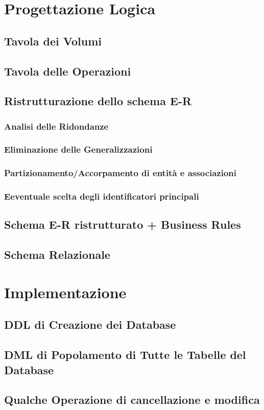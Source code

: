 \documentclass[letterpaper]{report}
\begin{document}
\chapter{Progettazione Logica}
\section{Tavola dei Volumi}



\section{Tavola delle Operazioni}



\section{Ristrutturazione dello schema E-R}
\subsection{Analisi delle Ridondanze}
\subsection{Eliminazione delle Generalizzazioni}
\subsection{Partizionamento/Accorpamento di entità e associazioni}
\subsection{Eeventuale scelta degli identificatori principali}
\section{Schema E-R ristrutturato + Business Rules}


\section{Schema Relazionale}

\chapter{Implementazione}
\section{DDL di Creazione dei Database}
\section{DML di Popolamento di Tutte le Tabelle del Database}
\section{Qualche Operazione di cancellazione e modifica}
\end{document}
